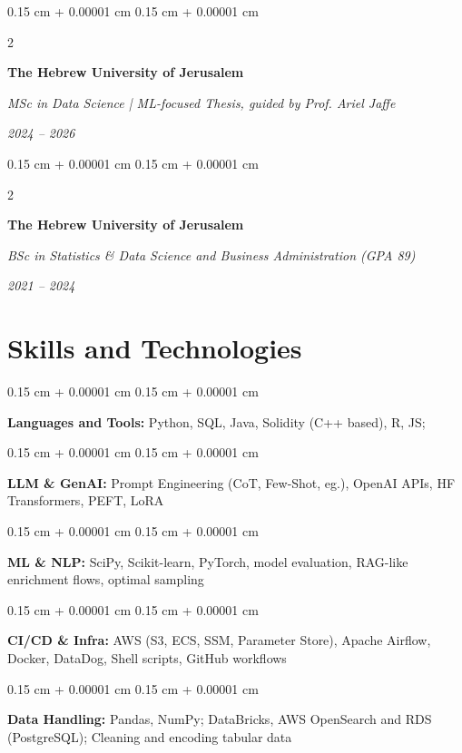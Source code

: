 \documentclass[10pt, letterpaper]{article}
\newenvironment{onecolentry}{
    \begin{adjustwidth}{
        0.15 cm + 0.00001 cm
    }{
        0.15 cm + 0.00001 cm
    }
}{
    \end{adjustwidth}
} %
\newenvironment{twocolentry}[2][]{
    \onecolentry
    \def\secondColumn{#2}
    \setcolumnwidth{\fill, 4.5 cm}
    \begin{paracol}{2}
}{
    \switchcolumn \raggedleft \secondColumn
    \end{paracol}
    \endonecolentry
} %
\begin{document}
        
        \begin{twocolentry}{
            
            
        \textit{2024 – 2026}}
            \textbf{The Hebrew University of Jerusalem}

            \textit{MSc in Data Science | ML-focused Thesis, guided by Prof. Ariel Jaffe}
        \end{twocolentry}



        \vspace{0.15 cm}

        \begin{twocolentry}{
            
            
        \textit{2021 – 2024}}
            \textbf{The Hebrew University of Jerusalem}

            \textit{BSc in Statistics \& Data Science and Business Administration (GPA 89)}
        \end{twocolentry}




    
    \section{Skills and Technologies}



        
        \begin{onecolentry}
            \textbf{Languages and Tools:} Python, SQL, Java, Solidity (C++ based), R, JS;
        \end{onecolentry}

        \vspace{0.15 cm}

        \begin{onecolentry}
            \textbf{LLM \& GenAI:} Prompt Engineering (CoT, Few-Shot, eg.), OpenAI APIs, HF Transformers, PEFT, LoRA
        \end{onecolentry}

        \vspace{0.15 cm}

        \begin{onecolentry}
            \textbf{ML \& NLP:} SciPy, Scikit-learn, PyTorch, model evaluation, RAG-like enrichment flows, optimal sampling
        \end{onecolentry}

        \vspace{0.15 cm}

        \begin{onecolentry}
            \textbf{CI/CD \& Infra:} AWS (S3, ECS, SSM, Parameter Store), Apache Airflow, Docker, DataDog, Shell scripts, GitHub workflows
        \end{onecolentry}

        \vspace{0.15 cm}

        \begin{onecolentry}
            \textbf{Data Handling:} Pandas, NumPy; DataBricks, AWS OpenSearch and RDS (PostgreSQL); Cleaning and  encoding tabular data
        \end{onecolentry}


    
\end{document}
